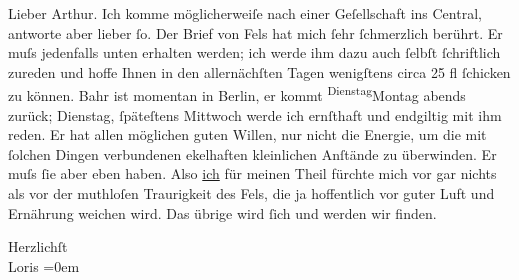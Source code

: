 \pstart\center{}Lieber Arthur.\pend\vspace{0.5em}
\pstart
           Ich komme möglicherweiſe nach einer Geſellschaft ins Central, antworte aber lieber{ }ſo. Der Brief von Fels hat mich{ }ſehr{ }ſchmerzlich berührt. Er muſs jedenfalls
               unten erhalten werden; ich werde ihm dazu auch{ }ſelbſt{ }ſchriftlich zureden und hoffe
               Ihnen in den allernächſten Tagen wenigſtens circa 25 fl{ }ſchicken zu können. Bahr ist momentan in Berlin, {\pb}er
               kommt \substVorne{}\textsuperscript{Dienstag}\substDazwischen{}Montag\substHinten{} abends zurück; Dienstag,{ }ſpäteſtens Mittwoch werde ich ernſthaft und
               endgiltig mit ihm reden. Er hat allen möglichen guten Willen, nur nicht die Energie,
               um die mit{ }ſolchen Dingen verbundenen ekelhaften kleinlichen Anſtände zu überwinden.
               Er muſs{ }ſie aber eben haben. Also \uline{ich} für meinen
               Theil fürchte mich vor gar nichts als vor der muthloſen {\pb}Traurigkeit des Fels, die ja hoffentlich vor guter Luft und Ernährung weichen
               wird. Das übrige wird{ }ſich und werden wir finden.\pend
           
\pstart
           Herzlichſt{\\[\baselineskip]}\spacefill\mbox{Loris}\pend
           \leftskip=0em{}\endnumbering{}  \newcommand{\dateiname}{L00179}\newcommand{\titel}{Hugo von Hofmannsthal an Arthur Schnitzler, [18. 2. 1893]}\newcommand{\editorInnen}{Herausgegeben von Martin Anton Müller}
